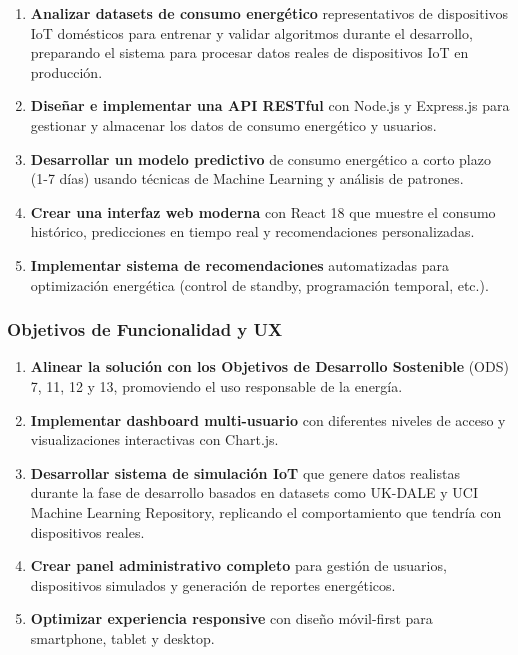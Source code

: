 \documentclass[12pt,a4paper,spanish]{article}
\begin{document}
\begin{enumerate}
    \item \textbf{Analizar datasets de consumo energético} representativos de dispositivos IoT domésticos para entrenar y validar algoritmos durante el desarrollo, preparando el sistema para procesar datos reales de dispositivos IoT en producción.

    \item \textbf{Diseñar e implementar una API RESTful} con Node.js y Express.js para gestionar y almacenar los datos de consumo energético y usuarios.

    \item \textbf{Desarrollar un modelo predictivo} de consumo energético a corto plazo (1-7 días) usando técnicas de Machine Learning y análisis de patrones.

    \item \textbf{Crear una interfaz web moderna} con React 18 que muestre el consumo histórico, predicciones en tiempo real y recomendaciones personalizadas.

    \item \textbf{Implementar sistema de recomendaciones} automatizadas para optimización energética (control de standby, programación temporal, etc.).
\end{enumerate}

\subsubsection{Objetivos de Funcionalidad y UX}

\begin{enumerate}[resume]
    \item \textbf{Alinear la solución con los Objetivos de Desarrollo Sostenible} (ODS) 7, 11, 12 y 13, promoviendo el uso responsable de la energía.

    \item \textbf{Implementar dashboard multi-usuario} con diferentes niveles de acceso y visualizaciones interactivas con Chart.js.

    \item \textbf{Desarrollar sistema de simulación IoT} que genere datos realistas durante la fase de desarrollo basados en datasets como UK-DALE y UCI Machine Learning Repository, replicando el comportamiento que tendría con dispositivos reales.

    \item \textbf{Crear panel administrativo completo} para gestión de usuarios, dispositivos simulados y generación de reportes energéticos.

    \item \textbf{Optimizar experiencia responsive} con diseño móvil-first para smartphone, tablet y desktop.
\end{enumerate}
\end{document}

